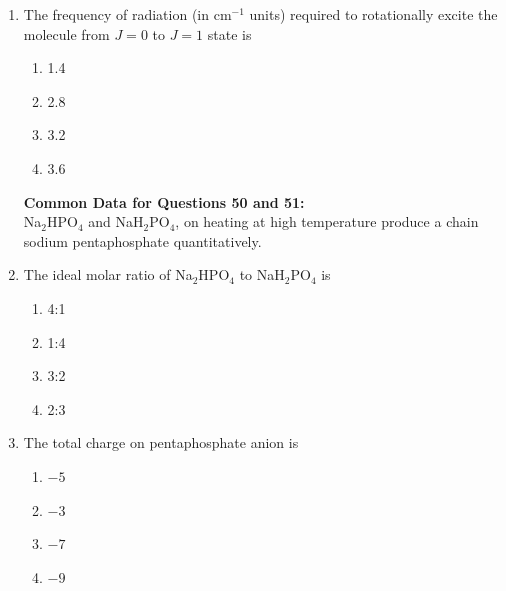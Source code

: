 \documentclass[journal,12pt,onecolumn]{IEEEtran}
\theoremstyle{remark}
\begin{document}
\begin{enumerate}
\item    \hspace{0.5cm} The frequency of radiation (in cm\(^{-1}\) units) required to rotationally excite the molecule from \(J = 0\) to \(J = 1\) state is  \hfill{}

\begin{multicols}{2}
\begin{enumerate}
    \item 1.4
    \item 2.8
    \item 3.2
    \item 3.6
\end{enumerate}
\end{multicols}

 

\noindent\textbf{Common Data for Questions 50 and 51:}\\
Na\(_2\)HPO\(_4\) and NaH\(_2\)PO\(_4\), on heating at high temperature produce a chain sodium pentaphosphate quantitatively.

 

\item    \hspace{0.5cm} The ideal molar ratio of Na\(_2\)HPO\(_4\) to NaH\(_2\)PO\(_4\) is  \hfill{}

\begin{multicols}{2}
\begin{enumerate}
    \item 4:1
    \item 1:4
    \item 3:2
    \item 2:3
\end{enumerate}
\end{multicols}

 

\item    \hspace{0.5cm} The total charge on pentaphosphate anion is  \hfill{}

\begin{multicols}{2}
\begin{enumerate}
    \item $-5$
    \item $-3$
    \item $-7$
    \item $-9$
\end{enumerate}
\end{multicols}
 




\end{enumerate}
\end{document}
